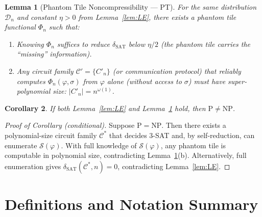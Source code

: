 \documentclass[11pt]{article}
\newtheorem{lemma}{Lemma}
\newtheorem{corollary}[lemma]{Corollary}
\theoremstyle{definition}
\begin{document}
\begin{lemma}[Phantom Tile Noncompressibility --- PT]
\label{lem:PT}
For the same distribution $\mathcal{D}_n$ and constant $\eta > 0$ from Lemma~\ref{lem:LE},
there exists a phantom tile functional $\Phi_n$ such that:
\begin{enumerate}
  \item[(a)] Knowing $\Phi_n$ suffices to reduce $\delta_{\mathrm{SAT}}$ below $\eta/2$
    (the phantom tile carries the ``missing'' information).
  \item[(b)] Any circuit family $\mathcal{C}' = \{C'_n\}$ (or communication protocol) that
    reliably computes $\Phi_n(\varphi, \sigma)$ from $\varphi$ alone (without access to $\sigma$)
    must have super-polynomial size: $|C'_n| = n^{\omega(1)}$.
\end{enumerate}
\end{lemma}

\begin{corollary}
\label{cor:PneqNP}
If both Lemma~\ref{lem:LE} and Lemma~\ref{lem:PT} hold, then $\mathrm{P} \neq \mathrm{NP}$.
\end{corollary}

\begin{proof}[Proof of Corollary (conditional)]
Suppose $\mathrm{P} = \mathrm{NP}$.  Then there exists a polynomial-size circuit family
$\mathcal{C}^*$ that decides 3-SAT and, by self-reduction, can enumerate $\mathcal{S}(\varphi)$.
With full knowledge of $\mathcal{S}(\varphi)$, any phantom tile is computable in polynomial size,
contradicting Lemma~\ref{lem:PT}(b).  Alternatively, full enumeration gives
$\delta_{\mathrm{SAT}}(\mathcal{C}^*, n) = 0$, contradicting Lemma~\ref{lem:LE}.
\end{proof}

\section{Definitions and Notation Summary}
\end{document}
